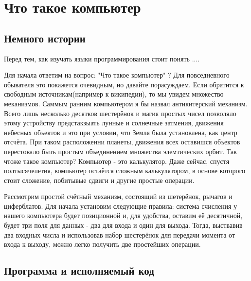 \documentclass{bmstu}
\begin{document}
\tableofcontents




\chapter{Что такое компьютер}
\section{Немного истории}
Перед тем, как изучать языки программирования стоит понять ....

Для начала ответим на вопрос: "Что такое компьютер" ? Для повседневного обывателя это покажется очевидным, но давайте порасуждаем. 
Если обратится к свободным источникам(например к википедии), то мы увидем множество меканизмов. 
Саммым ранним компьютером я бы назвал антикитерский механизм. 
Всего лишь несколько десятков шестерёнок и магия простых чисел позволяло этому устройству предстакзыать лунные и солнечные затмения, движения небесных объектов и это при условии, что Земля была установлена, как центр отсчёта. 
При таком расположенни планеты, движения всех оставишся объектов перестовало быть простым объединением множества элемтических орбит. 
Так чтоже такое компьютер? Компьютер - это калькулятор. Даже сейчас, спустя полтысячелетия, компьютер остаётся сложным калькулятором, в основе которого стоит сложение, побитывые сдвиги и другие простые операции. 

Рассмотрим простой счётный механизм, состоящий из шетерёнок, рычагов и циферблатов. 
Для начала установим следующие правила: система счисления у нашего компьютера будет позиционной и, для удобства, оставим её десятичной, будет три поля для данных - два для входа и один для выхода. 
Тогда, выствавив два входных числа и использовав набор шестерёнок для передачи момента от входа к выходу, можно легко получить две простейших операции. 



\section{Программа и исполняемый код}




\begin{comment}

\begin{lstlisting}
for (int i = 0; i < iterations; i++)
{
	do something
}
\end{lstlisting}

\end{comment}
\end{document}

